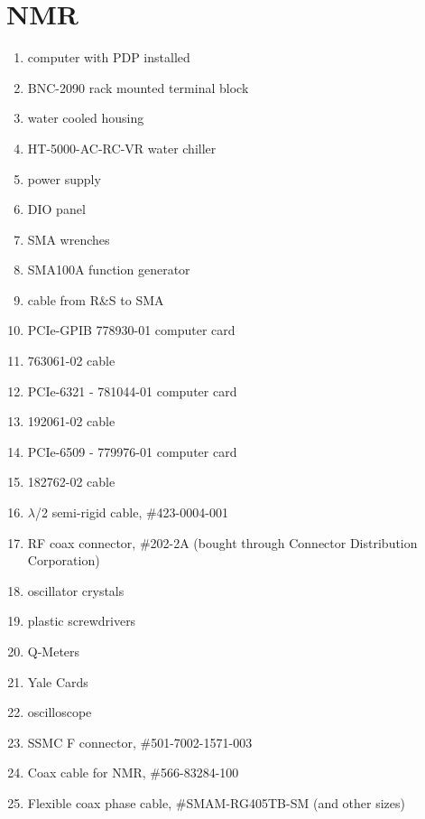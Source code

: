 \section{NMR}
\begin{enumerate}
\item computer with PDP installed
\item {} BNC-2090 rack mounted terminal block
\item water cooled housing
\item {} HT-5000-AC-RC-VR water chiller
\item power supply
\item DIO panel
 \item SMA wrenches
\item {}  SMA100A function generator
\item cable from R\&S to SMA
\item {} PCIe-GPIB 778930-01 computer card
\item {}763061-02 cable
\item {} PCIe-6321 - 781044-01 computer card
\item {} 192061-02 cable
\item {} PCIe-6509 - 779976-01 computer card
\item {} 182762-02 cable
\item {} $\lambda$/2 semi-rigid cable, \#423-0004-001
\item {} RF coax connector, \#202-2A (bought through Connector Distribution Corporation)
\item oscillator crystals
\item plastic screwdrivers
\item Q-Meters
\item Yale Cards
\item oscilloscope
\item {} SSMC F connector, \#501-7002-1571-003
\item {} Coax cable for NMR, \#566-83284-100
\item {} Flexible coax phase cable, \#SMAM-RG405TB-SM (and other sizes)
\end{enumerate}


